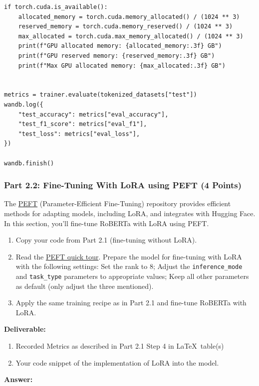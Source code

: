 \documentclass[11pt, oneside]{article}   	%
\begin{document}
\begin{verbatim}
if torch.cuda.is_available():
    allocated_memory = torch.cuda.memory_allocated() / (1024 ** 3)
    reserved_memory = torch.cuda.memory_reserved() / (1024 ** 3)
    max_allocated = torch.cuda.max_memory_allocated() / (1024 ** 3)
    print(f"GPU allocated memory: {allocated_memory:.3f} GB")
    print(f"GPU reserved memory: {reserved_memory:.3f} GB")
    print(f"Max GPU allocated memory: {max_allocated:.3f} GB")


metrics = trainer.evaluate(tokenized_datasets["test"])
wandb.log({
    "test_accuracy": metrics["eval_accuracy"],
    "test_f1_score": metrics["eval_f1"],
    "test_loss": metrics["eval_loss"],
})

wandb.finish()
\end{verbatim}

\newpage

\subsubsection*{Part 2.2: Fine-Tuning With LoRA using PEFT (4 Points)}
The \href{https://github.com/huggingface/peft}{PEFT} (Parameter-Efficient Fine-Tuning) repository provides efficient methods for adapting models, including LoRA, and integrates with Hugging Face. In this section, you’ll fine-tune RoBERTa with LoRA using PEFT.
\begin{enumerate}
    \item Copy your code from Part 2.1 (fine-tuning without LoRA).
    \item \label{step2} Read the \href{https://huggingface.co/docs/peft/quicktour}{PEFT quick tour}. Prepare the model for fine-tuning with LoRA with the following settings: Set the rank to 8; Adjust the \texttt{inference\_mode} and \texttt{task\_type} parameters to appropriate values; Keep all other parameters as default (only adjust the three mentioned).
   \item Apply the same training recipe as in Part 2.1 and fine-tune RoBERTa with LoRA.
\end{enumerate}

\textbf{Deliverable:}
\begin{enumerate}
    \item Recorded Metrics as described in Part 2.1 Step 4 in \LaTeX~table(s)
    \item Your code snippet of the implementation of LoRA into the model.
\end{enumerate}

\textbf{Answer:} \\
\end{document}
